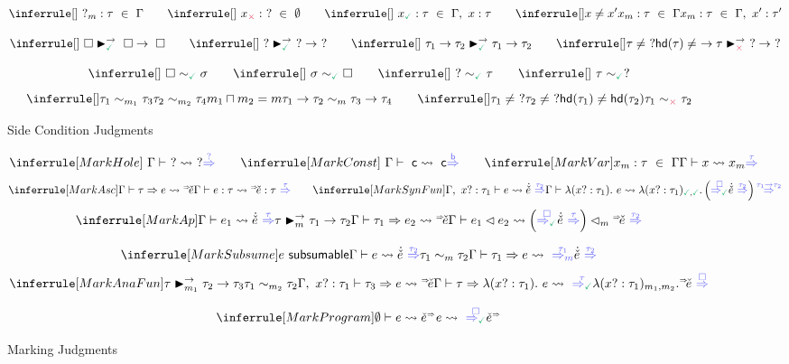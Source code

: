 \begin{figure}
    \centering

    \judgbox{\inCtx{\BV}{\TV}{\MV}{\ctx}}
    \vspace{-7pt}
    \[
    \inCtxHole\hspace{20pt}\inCtxEmpty\hspace{20pt}\inCtxFound\hspace{20pt}\inCtxSkip
    \]

    \judgbox{\matchedArrow{\DV}{\DV}{\DV}{\MV}}
    \vspace{-7pt}
    \[
    \matchedArrowNone\hspace{20pt}\matchedArrowHole\hspace{20pt}\matchedArrowArrow\hspace{20pt}\matchedArrowOther
    \]
    
    \judgbox{\consistent{\DV}{\DV}{\MV}}
    \vspace{-10pt}
    \[
    \consistentNoneL\hspace{20pt}\consistentNoneR\hspace{20pt}\consistentHoleL\hspace{20pt}\consistentHoleR
    \]
    \[
    \consistentArrow\hspace{20pt}\consistentOther
    \]
    \caption{Side Condition Judgments}
    \label{fig:side-conditions}
\end{figure}

\begin{figure}
    \centering

    \judgbox{\MarkSyn{\BEV}{\MEUV}}
    \[
    \MarkHole\hspace{20pt}\MarkConst\hspace{20pt}\MarkVar
    \]
    \[
    \MarkAsc\hspace{20pt}\MarkSynFun
    \]
    \[
    \MarkAp
    \]  

    \vspace{5pt}
    \judgbox{\MarkAna{\TV}{\BEV}{\MEUV}}
    \[
    \MarkSubsume
    \]
    \[
    \MarkAnaFun
    \]

    \vspace{5pt}
    \judgbox{\MarkProg{\BEV}{\MPV}}
    \[
    \MarkProgram
    \]
    \caption{Marking Judgments}
    \label{fig:marking}
\end{figure}

